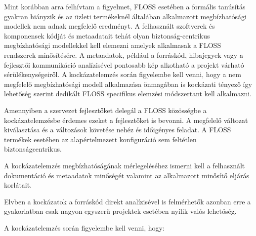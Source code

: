 \documentclass[12pt,magyar,a4paper,oneside]{scrreprt}
\begin{document}
Mint korábban arra felhívtam a figyelmet, FLOSS esetében a formális
tanúsítás gyakran hiányzik és az üzleti termékeknél általában
alkalmazott megbízhatósági modellek nem adnak megfelelő eredményt. A
felhasznált szoftverek és komponensek kódját és metaadatait tehát olyan
biztonság-centrikus megbízhatósági modellekkel kell elemezni amelyek
alkalmasak a FLOSS rendszerek minősítésére. A metaadatok, például a
forráskód, hibajegyek vagy a fejlesztői kommunikáció analízisével
pontosabb kép alkotható a projekt várható sérülékenységeiről. A
kockázatelemzés során figyelembe kell venni, hogy a nem megfelelő
megbízhatósági modell alkalmazása önmagában is kockázati tényező így
lehetőség szerint dedikált FLOSS specifikus elemzési módszertant kell
alkalmazni.

Amennyiben a szervezet fejlesztőket delegál a FLOSS közösségbe a
kockázatelemzésbe érdemes ezeket a fejlesztőket is bevonni. A megfelelő
változat kiválasztása és a változások követése nehéz és időigényes
feladat. A FLOSS termékek esetében az alapértelmezett konfiguráció sem
feltétlen biztonságcentrikus.

A kockázatelemzés megbízhatóságának mérlegeléséhez ismerni kell a
felhasznált dokumentáció és metaadatok minőségét valamint az alkalmazott
minősítő eljárás korlátait.

Elvben a kockázatok a forráskód direkt analízisével is felmérhetők
azonban erre a gyakorlatban csak nagyon egyszerű projektek esetében
nyílik valós lehetőség.

A kockázatelemzés során figyelembe kell venni, hogy:
\end{document}
